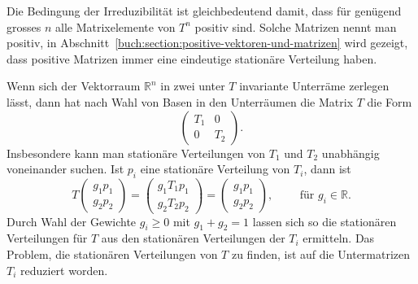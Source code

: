 Die Bedingung der Irreduzibilität ist gleichbedeutend damit,
dass für genügend grosses $n$ alle Matrixelemente von $T^n$ positiv sind.
Solche Matrizen nennt man positiv, 
in Abschnitt~\ref{buch:section:positive-vektoren-und-matrizen}
wird gezeigt, dass positive Matrizen immer eine eindeutige
stationäre Verteilung haben.

Wenn sich der Vektorraum $\mathbb{R}^n$ in zwei unter $T$ invariante
Unterräme zerlegen lässt, dann hat nach Wahl von Basen in den Unterräumen
die Matrix $T$ die Form
\[
\left(
\begin{array}{c|c}
T_1&0\\
\hline
0&T_2
\end{array}
\right).
\]
Insbesondere kann man stationäre Verteilungen von $T_1$ und $T_2$ 
unabhängig voneinander suchen.
Ist $p_i$ eine stationäre Verteilung von $T_i$, dann ist
\[
T
\left(
\begin{array}{c}
g_1p_1\\
\hline g_2p_2
\end{array}
\right)
=
\left(
\begin{array}{c}
g_1T_1p_1\\
\hline
g_2T_2p_2
\end{array}
\right)
=
\left(
\begin{array}{c}
g_1p_1\\
\hline
g_2p_2
\end{array}
\right),\qquad
\text{ für $g_i\in\mathbb{R}$.}
\]
Durch Wahl der Gewichte $g_i\ge 0$ mit $g_1+g_2=1$ lassen sich so
die stationären Verteilungen für $T$ aus den stationären Verteilungen
der $T_i$ ermitteln.
Das Problem, die stationären Verteilungen von $T$ zu finden, ist
auf die Untermatrizen $T_i$ reduziert worden.

